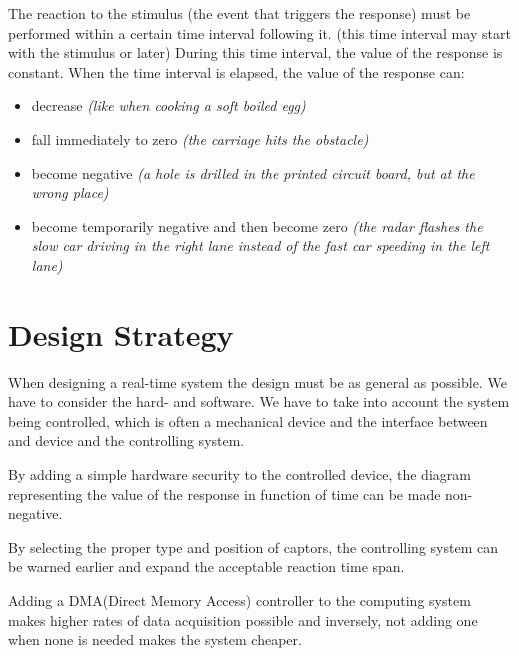 
The reaction to the stimulus (the event that triggers the response) must be performed within a certain time interval following it. (this time interval may start with the stimulus or later) During this time interval, the value of the response is constant. When the time interval is elapsed, the value of the response can:
\begin{itemize}
	\item decrease \textit{(like when cooking a soft boiled egg)}
	\item fall immediately to zero \textit{(the carriage hits the obstacle)}
	\item become negative \textit{(a hole is drilled in the printed circuit board, but at the wrong place)}
	\item become temporarily negative and then become zero\textit{ (the radar flashes the slow car driving in the right lane instead of the fast car speeding in the left lane)}
\end{itemize}

\section{Design Strategy}
When designing a real-time system the design must be as general as possible. We have to consider the hard- and software. We have to take into account the system being controlled, which is often a mechanical device and the interface between and device and the controlling system.

\begin{exmp}
By adding a simple hardware security to the controlled device, the diagram representing the value of the response in function of time can be made non-negative.
\end{exmp}

\begin{exmp}
By selecting the proper type and position of captors, the controlling system can be warned earlier and expand the acceptable reaction time span.
\end{exmp}

\begin{exmp}
Adding a DMA(Direct Memory Access) controller to the computing system makes higher rates of data acquisition possible and inversely, not adding one when none is needed makes the system cheaper.
\end{exmp}